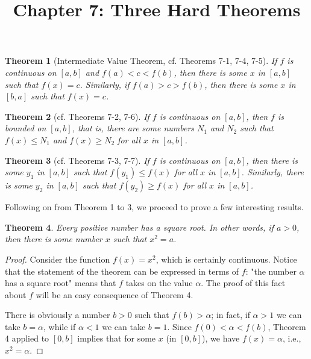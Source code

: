 \documentclass{article}
\newtheorem{theorem}{Theorem}
\begin{document}
\title{Chapter 7: Three Hard Theorems}
\maketitle

\begin{theorem}[Intermediate Value Theorem, cf. Theorems 7-1, 7-4, 7-5]
  If $f$ is continuous on $[a, b]$ and $f(a) < c < f(b)$, then there is some
  $x$ in $[a, b]$ such that $f(x) = c$. Similarly, if $f(a) > c > f(b)$, then
  there is some $x$ in $[b, a]$ such that $f(x) = c$.
\end{theorem}

\begin{theorem}[cf. Theorems 7-2, 7-6]
  If $f$ is continuous on $[a, b]$, then $f$ is bounded on $[a, b]$, that
  is, there are some numbers $N_1$ and $N_2$ such that $f(x) \leq N_1$ and
  $f(x) \geq N_2$ for all $x$ in $[a, b]$.
\end{theorem}

\begin{theorem}[cf. Theorems 7-3, 7-7]
  If $f$ is continuous on $[a, b]$, then there is some $y_1$ in $[a, b]$ such
  that $f(y_1) \leq f(x)$ for all $x$ in $[a, b]$. Similarly, there is some
  $y_2$ in $[a, b]$ such that $f(y_2) \geq f(x)$ for all $x$ in $[a, b]$.
\end{theorem}

Following on from Theorem 1 to 3, we proceed to prove a few interesting
results.

\setcounter{theorem}{7}
\begin{theorem}
  Every positive number has a square root. In other words, if $a > 0$, then
  there is some number $x$ such that $x^2 = a$.
\end{theorem}
\begin{proof}
  Consider the function $f(x) = x^2$, which is certainly continuous. Notice
  that the statement of the theorem can be expressed in terms of $f$: "the
  number $\alpha$ has a square root" means that $f$ takes on the value
  $\alpha$. The proof of this fact about $f$ will be an easy consequence of
  Theorem 4.

  There is obviously a number $b > 0$ such that $f(b) > \alpha$; in fact, if
  $\alpha > 1$ we can take $b = \alpha$, while if $\alpha < 1$ we can take $b =
  1$. Since $f(0) < \alpha < f(b)$, Theorem 4 applied to $[0, b]$ implies that
  for some $x$ (in $[0, b]$), we have $f(x) = \alpha$, i.e., $x^2 = \alpha$.
\end{proof}
\end{document}
